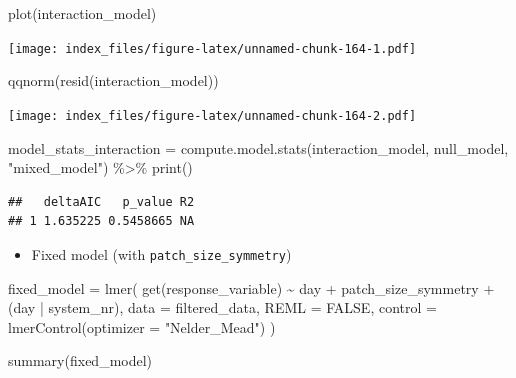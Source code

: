 \documentclass[
]{article}
\newenvironment{Shaded}{\begin{snugshade}}{\end{snugshade}}
\newcommand{\AttributeTok}[1]{\textcolor[rgb]{0.77,0.63,0.00}{#1}}
\newcommand{\ConstantTok}[1]{\textcolor[rgb]{0.00,0.00,0.00}{#1}}
\newcommand{\FunctionTok}[1]{\textcolor[rgb]{0.00,0.00,0.00}{#1}}
\newcommand{\NormalTok}[1]{#1}
\newcommand{\OtherTok}[1]{\textcolor[rgb]{0.56,0.35,0.01}{#1}}
\newcommand{\SpecialCharTok}[1]{\textcolor[rgb]{0.00,0.00,0.00}{#1}}
\newcommand{\StringTok}[1]{\textcolor[rgb]{0.31,0.60,0.02}{#1}}
\providecommand{\tightlist}{%
  \setlength{\itemsep}{0pt}\setlength{\parskip}{0pt}}
\begin{document}
\begin{Shaded}
\begin{Highlighting}[]
\FunctionTok{plot}\NormalTok{(interaction\_model)}
\end{Highlighting}
\end{Shaded}

\texttt{[image: index\_files/figure-latex/unnamed-chunk-164-1.pdf]}

\begin{Shaded}
\begin{Highlighting}[]
\FunctionTok{qqnorm}\NormalTok{(}\FunctionTok{resid}\NormalTok{(interaction\_model))}
\end{Highlighting}
\end{Shaded}

\texttt{[image: index\_files/figure-latex/unnamed-chunk-164-2.pdf]}

\begin{Shaded}
\begin{Highlighting}[]
\NormalTok{model\_stats\_interaction }\OtherTok{=} \FunctionTok{compute.model.stats}\NormalTok{(interaction\_model,}
\NormalTok{                                              null\_model,}
                                              \StringTok{"mixed\_model"}\NormalTok{) }\SpecialCharTok{\%\textgreater{}\%}
  \FunctionTok{print}\NormalTok{()}
\end{Highlighting}
\end{Shaded}

\begin{verbatim}
##   deltaAIC   p_value R2
## 1 1.635225 0.5458665 NA
\end{verbatim}

\begin{itemize}
\tightlist
\item
  Fixed model (with \texttt{patch\_size\_symmetry})
\end{itemize}

\begin{Shaded}
\begin{Highlighting}[]
\NormalTok{fixed\_model }\OtherTok{=} \FunctionTok{lmer}\NormalTok{(}
  \FunctionTok{get}\NormalTok{(response\_variable) }\SpecialCharTok{\textasciitilde{}}
\NormalTok{    day }\SpecialCharTok{+} 
\NormalTok{    patch\_size\_symmetry }\SpecialCharTok{+} 
\NormalTok{    (day }\SpecialCharTok{|}\NormalTok{ system\_nr), }
  \AttributeTok{data =}\NormalTok{ filtered\_data,}
  \AttributeTok{REML =} \ConstantTok{FALSE}\NormalTok{,}
  \AttributeTok{control =} \FunctionTok{lmerControl}\NormalTok{(}\AttributeTok{optimizer =} \StringTok{"Nelder\_Mead"}\NormalTok{)}
\NormalTok{)}

\FunctionTok{summary}\NormalTok{(fixed\_model)}
\end{Highlighting}
\end{Shaded}
\end{document}
